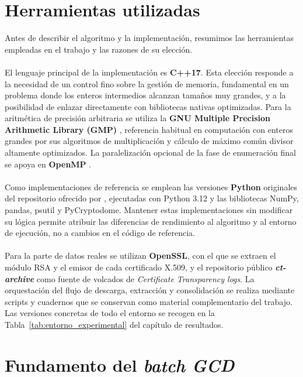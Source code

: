 \section{Herramientas utilizadas}
\label{sec:herramientas}
Antes de describir el algoritmo y la implementación, resumimos las herramientas empleadas en el trabajo y las razones de su elección.
\\
\\
El lenguaje principal de la implementación es \textbf{C++17}. Esta elección responde a la necesidad de un control fino sobre la gestión de memoria, fundamental en un problema donde los enteros intermedios alcanzan tamaños muy grandes, y a la posibilidad de enlazar directamente con bibliotecas nativas optimizadas. Para la aritmética de precisión arbitraria se utiliza la \textbf{GNU Multiple Precision Arithmetic Library (GMP)} \citep{gmp2023manual}, referencia habitual en computación con enteros grandes por sus algoritmos de multiplicación y cálculo de máximo común divisor altamente optimizados. La paralelización opcional de la fase de enumeración final se apoya en \textbf{OpenMP} \citep{openmp2021specification}.
\\
\\
Como implementaciones de referencia se emplean las versiones \textbf{Python} originales del repositorio ofrecido por \citet{pelofske2024efficient}, ejecutadas con Python 3.12 y las bibliotecas NumPy, pandas, psutil y PyCryptodome. Mantener estas implementaciones sin modificar su lógica permite atribuir las diferencias de rendimiento al algoritmo y al entorno de ejecución, no a cambios en el código de referencia.
\\
\\
Para la parte de datos reales se utilizan \textbf{OpenSSL}, con el que se extraen el módulo RSA y el emisor de cada certificado X.509, y el repositorio público \textbf{\textit{ct-archive}} \citep{geomys2026ctarchive} como fuente de volcados de \textit{Certificate Transparency logs}. La orquestación del flujo de descarga, extracción y consolidación se realiza mediante scripts y cuadernos que se conservan como material complementario del trabajo. Las versiones concretas de todo el entorno se recogen en la Tabla~\ref{tab:entorno_experimental} del capítulo de resultados.

\section{Fundamento del \textit{batch GCD}}

